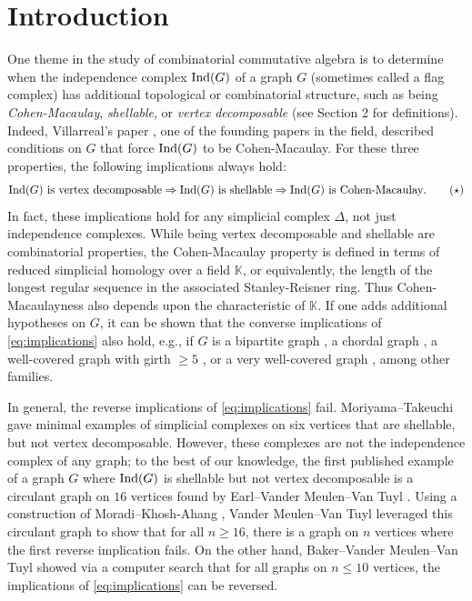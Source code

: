 \documentclass[10pt,a4paper]{amsart}
\theoremstyle{plain}
\theoremstyle{definition}
\theoremstyle{remark}
\numberwithin{equation}{section}
\numberwithin{equation}{section}
\begin{document}
\section{Introduction}
One theme in the study of combinatorial commutative algebra
is to  determine when the independence complex ${\rm Ind}(G)$ 
of a graph $G$ (sometimes called a flag complex) has additional 
topological or combinatorial structure, such as being
{\it Cohen-Macaulay}, {\it shellable}, or 
{\it vertex decomposable} (see 
Section 2 for definitions).  Indeed, Villarreal's paper \cite{V1990},
one of the founding papers in the field,
described conditions on $G$ that force ${\rm Ind}(G)$ to 
be Cohen-Macaulay.
For these three properties,  the following implications always hold:
\begin{equation}\label{eq:implications}
{\rm Ind}(G)~\text{is vertex decomposable}
\Rightarrow {\rm Ind}(G)~\text{is shellable} 
\Rightarrow {\rm Ind}(G)~\text{is Cohen-Macaulay}.
\tag{$\star$}
\end{equation}
In fact, these implications hold for any simplicial complex $\Delta$,
not just independence complexes.  While being vertex 
decomposable and shellable
are combinatorial properties, the Cohen-Macaulay property is defined in terms
of reduced simplicial homology over a field $\mathbb{K}$, or equivalently,
the length of the longest regular sequence in the associated Stanley-Reisner ring. Thus Cohen-Macaulayness also
depends upon the characteristic of $\mathbb{K}$.
If one adds additional hypotheses
on $G$, it can be shown that the converse implications of \eqref{eq:implications} also hold, e.g.,
if $G$ is a bipartite graph \cite{VT2009}, a chordal
graph \cites{DE2009,HHZ2006,W2009}, a well-covered graph with girth
$\geq 5$ \cite{BC2014},  or a very well-covered graph \cite{Metal2011}, among
other families.  

In general, the reverse implications of \eqref{eq:implications} fail.
Moriyama--Takeuchi \cite{MT2003} gave minimal examples of simplicial complexes
on six vertices that are shellable, but not vertex decomposable. However,
these complexes are not the independence complex of any graph;
to the best of our knowledge, the first published example
of a graph $G$ where ${\rm Ind}(G)$ is shellable but not vertex decomposable
is a circulant graph on $16$ vertices found by Earl--Vander Meulen--Van Tuyl \cite{EVMVT2016}.  Using a construction of Moradi--Khosh-Ahang \cite{MKA2016},
Vander Meulen--Van Tuyl \cite{VMVT2017}  leveraged this circulant graph to show that for all $n \geq 16$, there is
a graph on $n$ vertices where the first reverse implication fails. On the 
other hand, Baker--Vander Meulen--Van Tuyl \cite{BVMVT2018} showed via
a computer search that
for all graphs on $n \leq 10$ vertices, 
the implications
of \eqref{eq:implications} can be reversed. 
\end{document}
